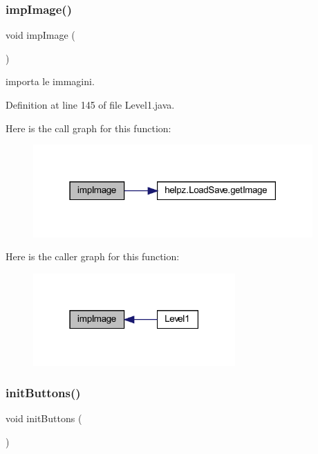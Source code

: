 \subsubsection{\texorpdfstring{imp\+Image()}{impImage()}}
{\footnotesize\ttfamily void imp\+Image (\begin{DoxyParamCaption}{ }\end{DoxyParamCaption})\hspace{0.3cm}{\ttfamily [private]}}



importa le immagini. 



Definition at line 145 of file Level1.\+java.

Here is the call graph for this function\+:\nopagebreak
\begin{figure}[H]
\begin{center}
\leavevmode
\includegraphics[width=303pt]{classscenes_1_1_level1_aded9c531b53772fd90d09a8b6bf0132e_cgraph}
\end{center}
\end{figure}
Here is the caller graph for this function\+:\nopagebreak
\begin{figure}[H]
\begin{center}
\leavevmode
\includegraphics[width=219pt]{classscenes_1_1_level1_aded9c531b53772fd90d09a8b6bf0132e_icgraph}
\end{center}
\end{figure}
\mbox{\label{classscenes_1_1_level1_a27d3ba5afb772cc36c9a432c28975ace}} 
\subsubsection{\texorpdfstring{init\+Buttons()}{initButtons()}}
{\footnotesize\ttfamily void init\+Buttons (\begin{DoxyParamCaption}{ }\end{DoxyParamCaption})\hspace{0.3cm}{\ttfamily [private]}}



